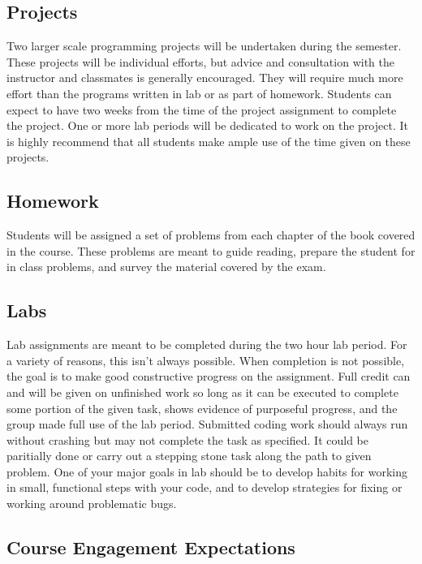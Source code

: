 \documentclass[10pt]{article}
\begin{document}
\subsection*{Projects}

Two larger scale programming projects will be undertaken during the semester. These projects will be individual efforts, but advice and consultation with the instructor and classmates is generally encouraged. They will require much more effort than the programs written in lab or as part of homework. Students can expect to have two weeks from the time of the project assignment to complete the project. One or more lab periods will be dedicated to work on the project. It is highly recommend that all students make ample use of the time given on these projects.

\subsection*{Homework}

Students will be assigned a set of problems from each chapter of the book covered in the course. These problems are meant to guide reading, prepare the student for in class problems, and survey the material covered by the exam.

\subsection*{Labs}

Lab assignments are meant to be completed during the two hour lab period. For a variety of reasons, this isn't always possible. When completion is not possible, the goal is to make good constructive progress on the assignment. Full credit can and will be given on unfinished work so long as it can be executed to complete some portion of the given task, shows evidence of purposeful progress, and the group made full use of the lab period. Submitted coding work should always run without crashing but may not complete the task as specified. It could be paritially done or carry out a stepping stone task along the path to given problem. One of your major goals in lab should be to develop habits for working in small, functional steps with your code, and to develop strategies for fixing or working around problematic bugs.

\subsection{Course Engagement Expectations}
\end{document}
